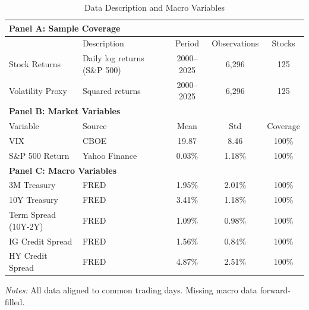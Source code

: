 \begin{table}[htbp]
\centering
\caption{Data Description and Macro Variables}
\label{tab:data_description}
\small
\begin{tabular}{llccc}
\toprule
\multicolumn{5}{l}{\textbf{Panel A: Sample Coverage}} \\
\midrule
& Description & Period & Observations & Stocks \\
\midrule
Stock Returns & Daily log returns (S\&P 500) & 2000--2025 & 6,296 & 125 \\
Volatility Proxy & Squared returns & 2000--2025 & 6,296 & 125 \\
\midrule
\multicolumn{5}{l}{\textbf{Panel B: Market Variables}} \\
\midrule
Variable & Source & Mean & Std & Coverage \\
\midrule
VIX & CBOE & 19.87 & 8.46 & 100\% \\
S\&P 500 Return & Yahoo Finance & 0.03\% & 1.18\% & 100\% \\
\midrule
\multicolumn{5}{l}{\textbf{Panel C: Macro Variables}} \\
\midrule
3M Treasury & FRED & 1.95\% & 2.01\% & 100\% \\
10Y Treasury & FRED & 3.41\% & 1.18\% & 100\% \\
Term Spread (10Y-2Y) & FRED & 1.09\% & 0.98\% & 100\% \\
IG Credit Spread & FRED & 1.56\% & 0.84\% & 100\% \\
HY Credit Spread & FRED & 4.87\% & 2.51\% & 100\% \\
\bottomrule
\end{tabular}
\begin{tablenotes}\small
\item \textit{Notes:} All data aligned to common trading days. Missing macro data forward-filled.
\end{tablenotes}
\end{table}


